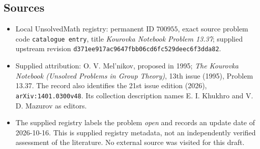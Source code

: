 \documentclass[11pt]{article}
\begin{document}
\subsection{Sources}
\begin{itemize}
\item Local UnsolvedMath registry: permanent ID \(700955\), exact source problem code \texttt{catalogue entry}, title \emph{Kourovka Notebook Problem 13.37}; supplied upstream revision \texttt{d371ee917ac9647fbb06cd6fc529deec6f3dda82}.
\item Supplied attribution: O. V. Mel'nikov, proposed in 1995; \emph{The Kourovka Notebook (Unsolved Problems in Group Theory)}, 13th issue (1995), Problem 13.37. The record also identifies the 21st issue edition (2026), \texttt{arXiv:1401.0300v48}. Its collection description names E. I. Khukhro and V. D. Mazurov as editors.
\item The supplied registry labels the problem \emph{open} and records an update date of 2026-10-16. This is supplied registry metadata, not an independently verified assessment of the literature. No external source was visited for this draft.
\end{itemize}
\end{document}
